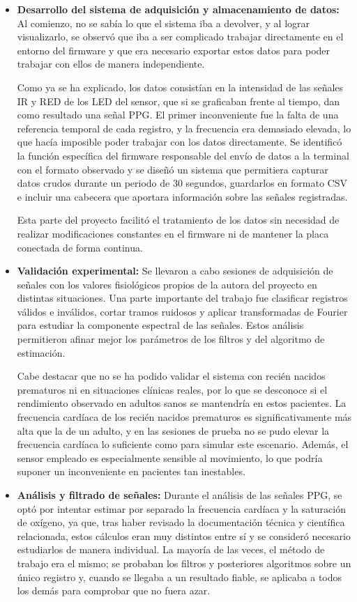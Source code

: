 \begin{itemize}
\item \textbf{Desarrollo del sistema de adquisición y almacenamiento de datos:} Al comienzo, no se sabía lo que el sistema iba a devolver, y al lograr visualizarlo, se observó que iba a ser complicado trabajar directamente en el entorno del firmware y que era necesario exportar estos datos para poder trabajar con ellos de manera independiente. 

Como ya se ha explicado, los datos consistían en la intensidad de las señales IR y RED de los LED del sensor, que si se graficaban frente al tiempo, dan como resultado una señal PPG. El primer inconveniente fue la falta de una referencia temporal de cada registro, y la frecuencia era demasiado elevada, lo que hacía imposible poder trabajar con los datos directamente. Se identificó la función específica del firmware responsable del envío de datos a la terminal con el formato observado y se diseñó un sistema que permitiera capturar datos crudos durante un periodo de 30 segundos, guardarlos en formato CSV e incluir una cabecera que aportara información sobre las señales registradas. 

Esta parte del proyecto facilitó el tratamiento de los datos sin necesidad de realizar modificaciones constantes en el firmware ni de mantener la placa conectada de forma continua.

\item \textbf{Validación experimental:} Se llevaron a cabo sesiones de adquisición de señales con los valores fisiológicos propios de la autora del proyecto en distintas situaciones. Una parte importante del trabajo fue clasificar registros válidos e inválidos, cortar tramos ruidosos y aplicar transformadas de Fourier para estudiar la componente espectral de las señales. Estos análisis permitieron afinar mejor los parámetros de los filtros y del algoritmo de estimación.

Cabe destacar que no se ha podido validar el sistema con recién nacidos prematuros ni en situaciones clínicas reales, por lo que se desconoce si el rendimiento observado en adultos sanos se mantendría en estos pacientes. La frecuencia cardíaca de los recién nacidos prematuros es significativamente más alta que la de un adulto, y en las sesiones de prueba no se pudo elevar la frecuencia cardíaca lo suficiente como para simular este escenario. Además, el sensor empleado es especialmente sensible al movimiento, lo que podría suponer un inconveniente en pacientes tan inestables.

\item \textbf{Análisis y filtrado de señales:} Durante el análisis de las señales PPG, se optó por intentar estimar por separado la frecuencia cardíaca y la saturación de oxígeno, ya que, tras haber revisado la documentación técnica y científica relacionada, estos cálculos eran muy distintos entre sí y se consideró necesario estudiarlos de manera individual. La mayoría de las veces, el método de trabajo era el mismo; se probaban los filtros y posteriores algoritmos sobre un único registro y, cuando se llegaba a un resultado fiable, se aplicaba a todos los demás para comprobar que no fuera azar.


\end{itemize}
